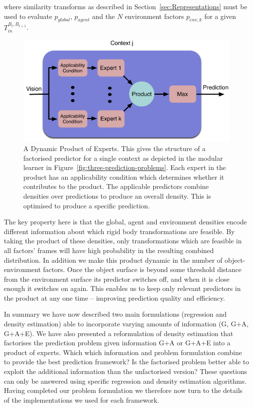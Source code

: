 \noindent where similarity transforms as described in Section~\ref{sec:Representations} must be used to evaluate $p_{global}$, $p_{agent}$ and the $N$ environment factors $p_{env,k}$ for a given ${T}_{in}^{B_{t}, B_{t+1}}$.
\begin{figure}[t]
\centerline{\includegraphics[width=0.85\columnwidth]{product-predictor}}
\caption[Factored Prediction]{ A Dynamic Product of Experts. This gives the structure of a factorised predictor for a single context as depicted in the modular learner in Figure~\ref{fig:three-prediction-problems}. Each expert in the product has an applicability condition which determines whether it contributes to the product. The applicable predictors combine densities over predictions to produce an overall density. This is optimised to produce a specific prediction.}
\label{fig:modular}
\end{figure}

The key property here is that the global, agent and environment densities encode different information about which rigid body transformations are feasible. By taking the product of these densities, only transformations which are feasible in all factors' frames will have high probability in the resulting combined distribution. In addition we make this product dynamic in the number of object-environment factors. Once the object surface is beyond some threshold distance from the environment surface its predictor switches off, and when it is close enough it switches on again. This enables us to keep only relevant predictors in the product at any one time -- improving prediction quality and efficiency. 

In summary we have now described two main formulations (regression and density estimation) able to incorporate varying amounts of information (G, G+A, G+A+E). We have also presented a reformulation of density estimation that factorises the prediction problem given information G+A or G+A+E into a product of experts. Which which information and problem formulation combine to provide the best prediction framework?
Is the factorised problem better able to exploit the additional
information than the unfactorised version? These questions can only be
answered using specific regression and density estimation
algorithms. Having completed our problem formulation we therefore now
turn to the details of the implementations we used for each framework.
